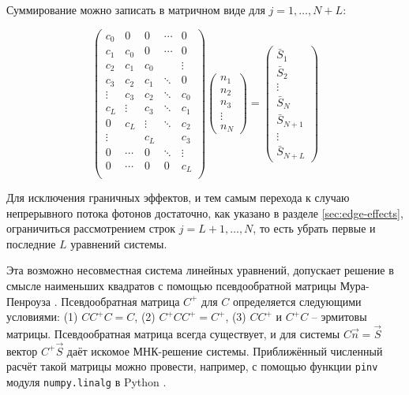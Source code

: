 \documentclass[12pt]{book}
\begin{document}
	Суммирование можно записать в матричном виде для $j = 1, \ldots, N + L$:
	
	\begin{equation}
		\begin{pmatrix} 
			c_0   &  0   &  0   &\dotsm&  0     \\
			c_1   & c_0  &  0   &\dotsm&  0     \\
			c_2   & c_1  & c_0  &      & \vdots \\
			c_3   & c_2  & c_1  &\ddots&  0     \\
     	    \vdots& c_3  & c_2  &\ddots&  c_0   \\
			c_L   &\vdots& c_3  &\ddots&  c_1   \\
			0     & c_L  &\vdots&\ddots&  c_2   \\
			\vdots&      & c_L  &      &  c_3   \\
			0     &\dotsm&  0   &\ddots& \vdots \\
			0     &\dotsm& 0    &   0  &  c_L   \\
		\end{pmatrix}
		\begin{pmatrix} 
			n_1 \\ n_2 \\ n_3 \\ \vdots \\ n_N
		\end{pmatrix}
		=
		\begin{pmatrix} 
			\bar{S}_1 \\ \bar{S}_2 \\
			\vdots \\
			\bar{S}_N \\ \bar{S}_{N+1} \\
			\vdots \\
			\bar{S}_{N+L}
		\end{pmatrix}
		\label{eq:mean-vector-calculation}
	\end{equation}

	Для исключения граничных эффектов, и тем самым перехода к случаю непрерывного потока фотонов достаточно, как указано в разделе \ref{sec:edge-effects}, ограничиться рассмотрением строк $j = L+1, \ldots, N$, то есть убрать первые и последние $L$ уравнений системы.

	Эта возможно несовместная система линейных уравнений, допускает решение в смысле наименьших квадратов с помощью псевдообратной матрицы Мура-Пенроуза \cite{Penrose1956}. Псевдообратная матрица $C^+$ для $C$ определяется следующими условиями: (1) $C C^+ C = C$, (2) $C^+ C C^+ = C^+$, (3) $C C^+$ и $C^+ C$ -- эрмитовы матрицы. Псевдообратная матрица всегда существует, и для системы $C\vec{n} = \vec{S}$ вектор $C^+ \vec{S}$ даёт искомое МНК-решение системы. Приближённый численный расчёт такой матрицы можно провести, например, с помощью функции \verb|pinv| модуля \verb|numpy.linalg| в Python \cite{Harris2020}.
\end{document}
